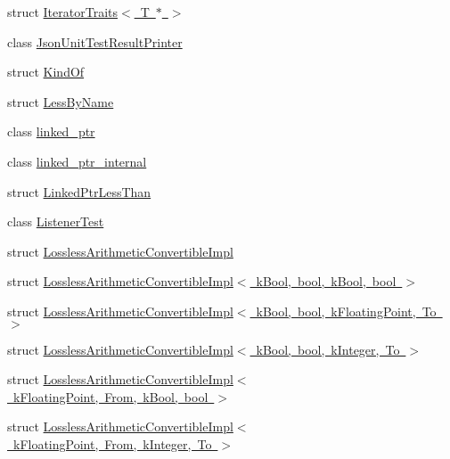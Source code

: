 \begin{DoxyCompactItemize}
\item 
struct \mbox{\hyperlink{structtesting_1_1internal_1_1_iterator_traits_3_01_t_01_5_01_4}{Iterator\+Traits$<$ T $\ast$ $>$}}
\item 
class \mbox{\hyperlink{classtesting_1_1internal_1_1_json_unit_test_result_printer}{Json\+Unit\+Test\+Result\+Printer}}
\item 
struct \mbox{\hyperlink{structtesting_1_1internal_1_1_kind_of}{Kind\+Of}}
\item 
struct \mbox{\hyperlink{structtesting_1_1internal_1_1_less_by_name}{Less\+By\+Name}}
\item 
class \mbox{\hyperlink{classtesting_1_1internal_1_1linked__ptr}{linked\+\_\+ptr}}
\item 
class \mbox{\hyperlink{classtesting_1_1internal_1_1linked__ptr__internal}{linked\+\_\+ptr\+\_\+internal}}
\item 
struct \mbox{\hyperlink{structtesting_1_1internal_1_1_linked_ptr_less_than}{Linked\+Ptr\+Less\+Than}}
\item 
class \mbox{\hyperlink{classtesting_1_1internal_1_1_listener_test}{Listener\+Test}}
\item 
struct \mbox{\hyperlink{structtesting_1_1internal_1_1_lossless_arithmetic_convertible_impl}{Lossless\+Arithmetic\+Convertible\+Impl}}
\item 
struct \mbox{\hyperlink{structtesting_1_1internal_1_1_lossless_arithmetic_convertible_impl_3_01k_bool_00_01bool_00_01k_bool_00_01bool_01_4}{Lossless\+Arithmetic\+Convertible\+Impl$<$ k\+Bool, bool, k\+Bool, bool $>$}}
\item 
struct \mbox{\hyperlink{structtesting_1_1internal_1_1_lossless_arithmetic_convertible_impl_3_01k_bool_00_01bool_00_01k_floating_point_00_01_to_01_4}{Lossless\+Arithmetic\+Convertible\+Impl$<$ k\+Bool, bool, k\+Floating\+Point, To $>$}}
\item 
struct \mbox{\hyperlink{structtesting_1_1internal_1_1_lossless_arithmetic_convertible_impl_3_01k_bool_00_01bool_00_01k_integer_00_01_to_01_4}{Lossless\+Arithmetic\+Convertible\+Impl$<$ k\+Bool, bool, k\+Integer, To $>$}}
\item 
struct \mbox{\hyperlink{structtesting_1_1internal_1_1_lossless_arithmetic_convertible_impl_3_01k_floating_point_00_01_from_00_01k_bool_00_01bool_01_4}{Lossless\+Arithmetic\+Convertible\+Impl$<$ k\+Floating\+Point, From, k\+Bool, bool $>$}}
\item 
struct \mbox{\hyperlink{structtesting_1_1internal_1_1_lossless_arithmetic_convertible_impl_3_01k_floating_point_00_01_from_00_01k_integer_00_01_to_01_4}{Lossless\+Arithmetic\+Convertible\+Impl$<$ k\+Floating\+Point, From, k\+Integer, To $>$}}

\end{DoxyCompactItemize}
